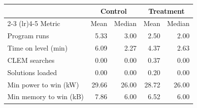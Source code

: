 \begin{tabular}{lrrrr}
\toprule
 & \multicolumn{2}{c}{Control} & \multicolumn{2}{c}{Treatment} \\
\cmidrule(lr){2-3} \cmidrule(lr){4-5}
Metric & Mean & Median & Mean & Median \\
\midrule
Program runs & 5.33 & 3.00 & 2.50 & 2.00 \\
Time on level (min) & 6.09 & 2.27 & 4.37 & 2.63 \\
CLEM searches & 0.00 & 0.00 & 0.37 & 0.00 \\
Solutions loaded & 0.00 & 0.00 & 0.20 & 0.00 \\
Min power to win (kW) & 29.66 & 26.00 & 28.72 & 26.00 \\
Min memory to win (kB) & 7.86 & 6.00 & 6.52 & 6.00 \\
\bottomrule
\end{tabular}
